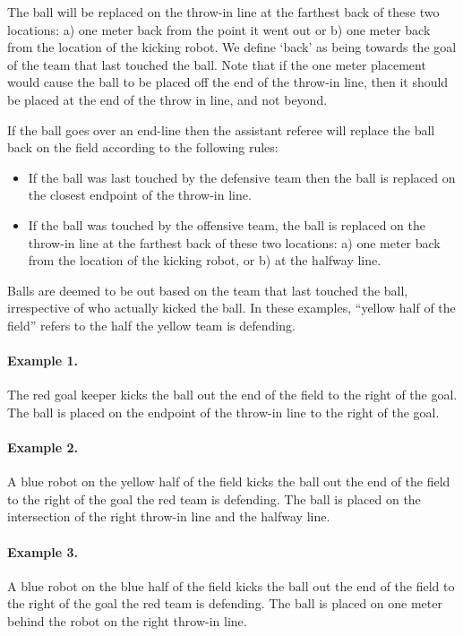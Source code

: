 \documentclass[12pt]{article}
\begin{document}
The ball will be replaced on the throw-in line at the farthest back of these two locations: a) one meter back from the point it went out or b) one meter back from the location of the kicking robot. We define `back' as being towards the goal of the team that last touched the ball. Note that if the one meter placement would cause the ball to be placed off the end of the throw-in line, then it should be placed at the end of the throw in line, and not beyond.

If the ball goes over an end-line then the assistant referee will replace the ball back on the field according to the following rules:

\begin{itemize}

\item If the ball was last touched by the defensive team then the ball is replaced on the closest endpoint of the throw-in line.

\item If the ball was touched by the offensive team, the ball is replaced on
the throw-in line at the farthest back of these two locations: a) one
meter back from the location of the kicking robot, or b) at the halfway
line.

\end{itemize}

Balls are deemed to be out based on the team that last touched the ball, irrespective of who actually kicked the ball.  In these examples, ``yellow half of the field'' refers to the half the yellow team is defending.

\paragraph{Example 1.} The red goal keeper kicks the ball out the end of the field to the right of the goal. The ball is placed on the endpoint of the throw-in line to the right of the goal.

\paragraph{Example 2.} A blue robot on the yellow half of the field kicks the ball out the end of the field to the right of the goal the red team is defending. The ball is placed on the intersection of the right throw-in line and the halfway line.

\paragraph{Example 3.} A blue robot on the blue half of the field kicks the ball out the end of the field to the right of the goal the red team is defending. The ball is placed on one meter behind the robot on the right throw-in line.
\end{document}
